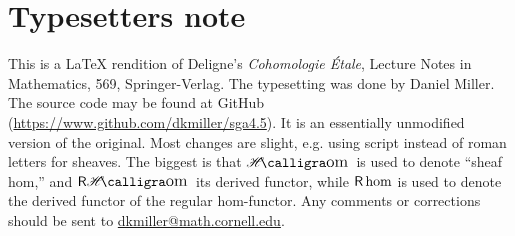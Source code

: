 
\section*{Typesetters note}

This is a \LaTeX{} rendition of Deligne's \emph{Cohomologie \'Etale}, Lecture 
Notes in Mathematics, 569, Springer-Verlag. The 
typesetting was done by Daniel Miller. The source code may be found at 
GitHub (\url{https://www.github.com/dkmiller/sga4.5}). It is an essentially 
unmodified version of the original. Most changes are slight, e.g. using 
script instead of roman letters for sheaves. The biggest is that 
$\Hom$ is used to denote ``sheaf hom,'' and $\rHom$ its derived functor, while 
$\operatorname{\mathsf{R}\hom}$ is used to denote the derived functor of the regular hom-functor. Any 
comments or corrections should be sent to \url{dkmiller@math.cornell.edu}.